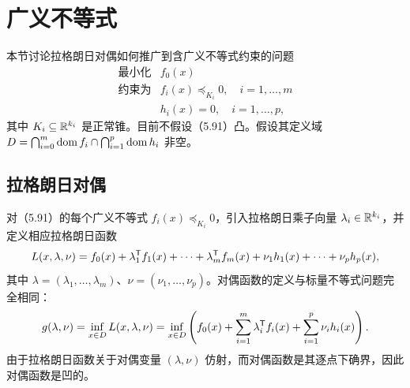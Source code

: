 \section{广义不等式}
本节讨论拉格朗日对偶如何推广到含广义不等式约束的问题
\begin{equation}
\begin{array}{ll}\text{最小化}&f_0(x)\\
\text{约束为}&f_i(x)\preceq_{K_i}0,\quad i=1,\ldots,m\\
&h_i(x)=0,\quad i=1,\ldots,p,\end{array}\tag{5.91}
\end{equation}
其中 $K_i\subseteq\mathbb R^{k_i}$ 是正常锥。目前不假设（5.91）凸。假设其定义域
$D=\bigcap_{i=0}^m\operatorname{dom} f_i\cap\bigcap_{i=1}^p\operatorname{dom} h_i$ 非空。

\subsection{拉格朗日对偶}
对（5.91）的每个广义不等式 $f_i(x)\preceq_{K_i}0$，引入拉格朗日乘子向量 $\lambda_i\in\mathbb R^{k_i}$，并定义相应拉格朗日函数
\[
L(x,\lambda,\nu)=f_0(x)+\lambda_1^\mathsf T f_1(x)+\cdots+\lambda_m^\mathsf T f_m(x)
+\nu_1h_1(x)+\cdots+\nu_ph_p(x),
\]
其中 $\lambda=(\lambda_1,\ldots,\lambda_m)$、$\nu=(\nu_1,\ldots,\nu_p)$。对偶函数的定义与标量不等式问题完全相同：
\[
g(\lambda,\nu)=\inf_{x\in D}L(x,\lambda,\nu)
=\inf_{x\in D}\left(f_0(x)+\sum_{i=1}^m\lambda_i^\mathsf T f_i(x)+\sum_{i=1}^p\nu_i h_i(x)\right).
\]
由于拉格朗日函数关于对偶变量 $(\lambda,\nu)$ 仿射，而对偶函数是其逐点下确界，因此对偶函数是凹的。
